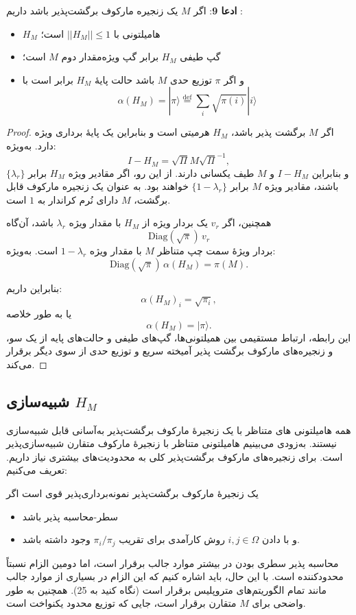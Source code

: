 \textbf{ادعا 9}:
اگر $M$ یک زنجیره مارکوف برگشت‌پذیر باشد داریم :
\begin{itemize}
	\item 
	 $H_M$
	هامیلتونی با
	$||H_M|| \le 1$ 
	است؛
	\item
	  گپ طیفی $H_M$ برابر گپ ویژه‌مقدار دوم $M$ است؛ 
	\item
	  و اگر $\pi$ توزیع حدی $M$ باشد حالت پایهٔ $H_M$ برابر است با 
	   $$\alpha(H_M) = |\pi\rangle \stackrel{\mathrm{def}}{=} \sum_i \sqrt{\pi(i)} |i\rangle$$
\end{itemize}
\begin{proof}
اگر $M$ برگشت پذیر باشد، $H_M$ هرمیتی است و بنابراین یک پایهٔ برداری ویژه دارد. به‌ویژه:  
\[
I - H_M = \sqrt{\Pi} M \sqrt{\Pi}^{-1},
\]  
و بنابراین $I - H_M$ و $M$ طیف یکسانی دارند. از این رو، اگر مقادیر ویژه $H_M$ برابر $\{\lambda_r\}$ باشند، مقادیر ویژه $M$ برابر $\{1 - \lambda_r\}$ خواهند بود. به عنوان یک زنجیره مارکوف قابل برگشت، $M$ دارای نُرم کراندار به $1$ است.  

همچنین، اگر $v_r$ یک بردار ویژه از $H_M$ با مقدار ویژه $\lambda_r$ باشد، آن‌گاه  
\[
\text{Diag}(\sqrt{\pi})\, v_r
\]  
بردار ویژهٔ سمت چپ متناظر $M$ با مقدار ویژه $1 - \lambda_r$ است. به‌ویژه:  
\[
\text{Diag}(\sqrt{\pi}) \,\alpha(H_M) = \pi(M).
\]  

بنابراین داریم:  
\[
\alpha(H_M)_i = \sqrt{\pi_i}, 
\]  
 یا به طور خلاصه
\[\alpha(H_M) = |\pi\rangle.\]
این رابطه، ارتباط مستقیمی بین همیلتونی‌ها، گپ‌های طیفی و حالت‌های پایه از یک سو، و زنجیره‌های مارکوف برگشت پذیر آمیخته سریع و توزیع حدی از سوی دیگر برقرار می‌کند.
\end{proof}
\subsection{ شبیه‌سازی $H_M$}
 همه هامیلتونی های متناظر با یک زنجیرهٔ مارکوف برگشت‌پذیر به‌آسانی قابل شبیه‌سازی نیستند. به‌زودی می‌بینیم هامیلتونی متناظر با زنجیرهٔ مارکوف متقارن شبیه‌سازی‌پذیر است. برای زنجیره‌های مارکوف برگشت‌پذیر کلی به محدودیت‌های بیشتری نیاز داریم. تعریف می‌کنیم: 
\begin{defn}
 یک زنجیرهٔ مارکوف برگشت‌پذیر نمونه‌برداری‌پذیر قوی است اگر 
 \begin{itemize}
 	\item 
 	سطر-‌محاسبه پذیر باشد
 	\item
 	 و با دادن $i, j \in \Omega$ روش کارآمدی برای تقریب $\pi_i/\pi_j$ وجود داشته باشد. 
 \end{itemize}

\end{defn}
{ محاسبه پذیر سطری بودن } در بیشتر موارد جالب برقرار است، اما دومین الزام نسبتاً محدودکننده است. با این حال، باید اشاره کنیم که این الزام در بسیاری از موارد جالب مانند تمام الگوریتم‌های متروپلیس برقرار است (نگاه کنید به {25}). همچنین به طور واضحی برای $M$ متقارن برقرار است، جایی که توزیع محدود یکنواخت است.
 

